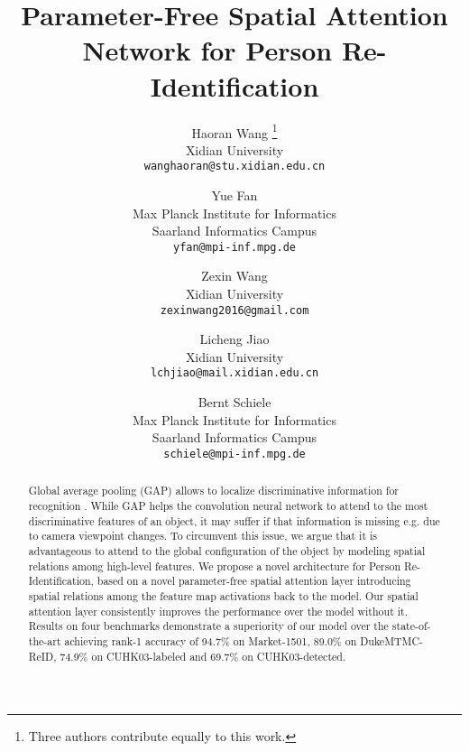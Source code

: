 \documentclass[10pt,twocolumn,letterpaper]{article}
\newcommand*\samethanks[1][\value{footnote}]{\footnotemark[#1]}
\begin{document}
\title{Parameter-Free Spatial Attention Network for Person Re-Identification}




\author{Haoran Wang \thanks{Three authors contribute equally to this work.} \\
Xidian University \\
{\tt\small wanghaoran@stu.xidian.edu.cn}
\and
Yue Fan \samethanks\\
Max Planck Institute for Informatics\\
Saarland Informatics Campus\\
{\tt\small yfan@mpi-inf.mpg.de}
\and
Zexin Wang \samethanks\\
Xidian University\\
{\tt\small zexinwang2016@gmail.com}
\and
Licheng Jiao\\
Xidian University\\
{\tt\small lchjiao@mail.xidian.edu.cn}
\and
Bernt Schiele\\
Max Planck Institute for Informatics\\
Saarland Informatics Campus\\
{\tt\small schiele@mpi-inf.mpg.de}
}

\maketitle


\begin{abstract}


Global average pooling (GAP) allows to localize discriminative information for recognition \cite{CAM}. While GAP helps the convolution neural network to attend to the most discriminative features of an object, it may suffer if that information is missing e.g. due to camera viewpoint changes.
To circumvent this issue, we argue that it is advantageous to attend to the global configuration of the object by modeling spatial relations among high-level features.
We propose a novel architecture for Person Re-Identification, based on a novel parameter-free spatial attention layer introducing spatial relations among the feature map activations back to the model.
Our spatial attention layer consistently improves the performance over the model without it. Results on four benchmarks demonstrate a superiority of our model over the state-of-the-art achieving rank-1 accuracy of 94.7\% on Market-1501, 89.0\% on DukeMTMC-ReID, 74.9\% on CUHK03-labeled and 69.7\% on CUHK03-detected. 





\end{abstract}
\end{document}
